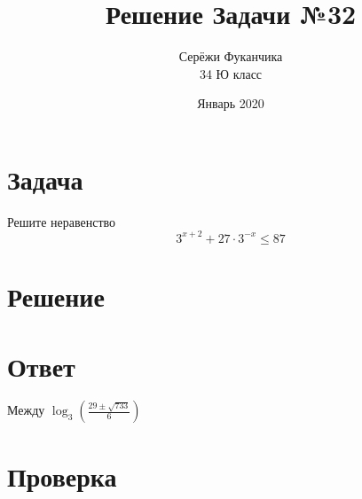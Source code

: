 \documentclass{article}
\title{Решение Задачи №32}
\author{Серёжи Фуканчика\\34 Ю класс}
\date{Январь 2020}
\begin{document}
\maketitle

\section{Задача}
Решите неравенство
$$
3^{x+2}+27\cdot{}3^{-x}\leq{}87
$$

\section{Решение}

\section{Ответ}
Между $\log_3(\frac{29\pm{}\sqrt{733}}{6})$

\section{Проверка}
\end{document}
